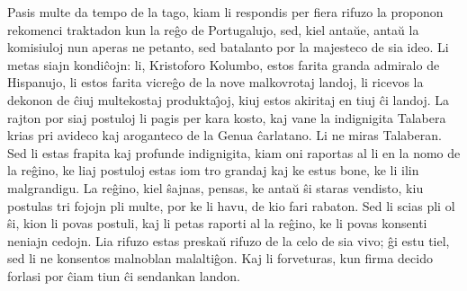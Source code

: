    Pasis multe da tempo de la tago, kiam li respondis per fiera rifuzo
la proponon rekomenci traktadon kun la re\^go de Portugalujo, sed,
kiel anta\u ue, anta\u u la komisiuloj nun aperas ne petanto, sed
batalanto por la majesteco de sia ideo. Li metas siajn kondi\^cojn:
li, Kristoforo Kolumbo, estos farita granda admiralo de Hispanujo,
li estos farita vicre\^go de la nove malkovrotaj landoj, li ricevos
la dekonon de \^ciuj multekostaj produkta\^{\j}oj, kiuj estos
akiritaj en tiuj \^ci landoj. La rajton por siaj postuloj li pagis
per kara kosto, kaj vane la indignigita Talabera krias pri avideco
kaj aroganteco de la Genua \^carlatano. Li ne miras Talaberan. Sed
li estas frapita kaj profunde indignigita, kiam oni raportas al li
en la nomo de la re\^gino, ke liaj postuloj estas iom tro grandaj
kaj ke estus bone, ke li ilin malgrandigu. La re\^gino, kiel
\^sajnas, pensas, ke anta\u u \^si staras vendisto, kiu postulas tri
fojojn pli multe, por ke li havu, de kio fari rabaton. Sed li scias
pli ol \^si, kion li povas postuli, kaj li petas raporti al la
re\^gino, ke li povas konsenti neniajn cedojn. Lia rifuzo estas
preska\u u rifuzo de la celo de sia vivo; \^gi estu tiel, sed li ne
konsentos malnoblan malalti\^gon. Kaj li forveturas, kun firma
decido forlasi por \^ciam tiun \^ci sendankan landon.

